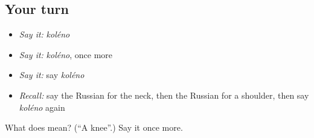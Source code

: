 \subsection*{Your turn}
\begin{itemize}
\raggedright
  \item \emph{Say it:} \emph{koléno}
  \item \emph{Say it:} \emph{koléno}, once more
  \item \emph{Say it:} say \emph{koléno}
  \item \emph{Recall:} say the Russian for the neck, then the Russian for a shoulder, then say \emph{koléno} again
\end{itemize}

\begin{tcolorbox}[breakable,colback=teal!4,colframe=teal!35!black,title={Before you move on}]
What does  mean? (\textquotedblleft{}A knee\textquotedblright{}.) Say it once more.
\end{tcolorbox}
